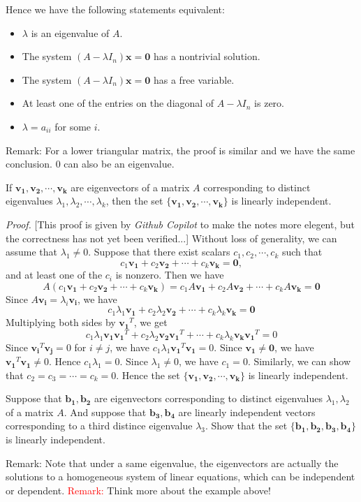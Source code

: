 \documentclass[10pt, a4paper]{article}
\newcommand{\vt}[1]{\mathbf{#1}}
\begin{document}
Hence we have the following statements equivalent:
\begin{itemize}
    \item $\lambda$ is an eigenvalue of $A$.
    \item The system $(A-\lambda I_n)\vt{x}=\vt{0}$ has a nontrivial solution.
    \item The system $(A-\lambda I_n)\vt{x}=\vt{0}$ has a free variable.
    \item At least one of the entries on the diagonal of $A-\lambda I_n$ is zero.
    \item $\lambda = a_{ii}$ for some $i$.
\end{itemize}
Remark: For a lower triangular matrix, the proof is similar and we have the same conclusion. 0 can also be an eigenvalue.

\begin{proposition}
    If $\vt{v_1}, \vt{v_2}, \cdots, \vt{v_k}$ are eigenvectors of a matrix $A$ corresponding to distinct eigenvalues $\lambda_1, \lambda_2, \cdots, \lambda_k$, then the set $\{\vt{v_1}, \vt{v_2}, \cdots, \vt{v_k}\}$ is linearly independent.
\end{proposition}
\textit{Proof.} [This proof is given by \textit{Github Copilot} to make the notes more elegent, but the correctness has not yet been verified...] Without loss of generality, we can assume that $\lambda_1\neq 0$. Suppose that there exist scalars $c_1, c_2, \cdots, c_k$ such that \[
c_1\vt{v_1}+c_2\vt{v_2}+\cdots+c_k\vt{v_k}=\vt{0},
\]
and at least one of the $c_i$ is nonzero. 
Then we have \[
A(c_1\vt{v_1}+c_2\vt{v_2}+\cdots+c_k\vt{v_k})=c_1A\vt{v_1}+c_2A\vt{v_2}+\cdots+c_kA\vt{v_k}=\vt{0}
\]
Since $A\vt{v_i}=\lambda_i\vt{v_i}$, we have \[
c_1\lambda_1\vt{v_1}+c_2\lambda_2\vt{v_2}+\cdots+c_k\lambda_k\vt{v_k}=\vt{0}
\]
Multiplying both sides by $\vt{v_1}^T$, we get \[
c_1\lambda_1\vt{v_1}\vt{v_1}^T+c_2\lambda_2\vt{v_2}\vt{v_1}^T+\cdots+c_k\lambda_k\vt{v_k}\vt{v_1}^T=0
\]
Since $\vt{v_i}^T\vt{v_j}=0$ for $i\neq j$, we have $c_1\lambda_1\vt{v_1}^T\vt{v_1}=0$. Since $\vt{v_1}\neq \vt{0}$, we have $\vt{v_1}^T\vt{v_1}\neq 0$. Hence $c_1\lambda_1=0$. Since $\lambda_1\neq 0$, we have $c_1=0$. Similarly, we can show that $c_2=c_3=\cdots=c_k=0$. Hence the set $\{\vt{v_1}, \vt{v_2}, \cdots, \vt{v_k}\}$ is linearly independent.

\begin{example}
    Suppose that $\vt{b_1}, \vt{b_2}$ are eigenvectors corresponding to distinct eigenvalues $\lambda_1, \lambda_2$ of a matrix $A$. 
    And suppose that $\vt{b_3},\vt{b_4}$ are linearly independent vectors corresponding to a third distince eigenvalue $\lambda_3$.
    Show that the set $\{\vt{b_1}, \vt{b_2}, \vt{b_3}, \vt{b_4}\}$ is linearly independent.
\end{example}
\indent Remark: Note that under a same eigenvalue, the eigenvectors are actually the solutions to a homogeneous system of linear equations, which can be independent or dependent.
\indent \textcolor{red}{Remark:} Think more about the example above! 
\end{document}
